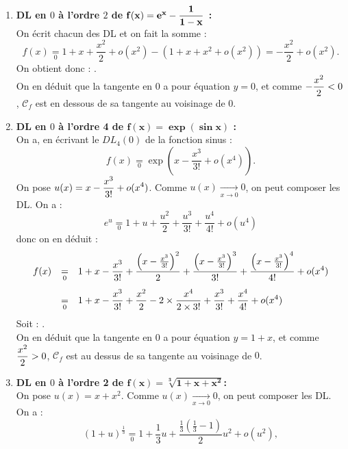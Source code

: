 \documentclass[a4paper, 11pt,reqno]{article}
\begin{document}
\begin{correction}  \;
	\begin{enumerate}
		\item \textbf{DL en $0$ \`a l'ordre $2$ de $\mathbf{f(x)=e^x-\displaystyle\frac{1}{1-x}}$ :}\\
		      On \'ecrit chacun des DL et on fait la somme :
		      $$f(x) \underset{0}{=}  1+x+\frac{x^2}{2}+o(x^2) - (1+x+x^2+o(x^2)) = -\frac{x^2}{2} + o(x^2).$$
		      On obtient donc : .\\
		      On en d\'eduit que la tangente en $0$ a pour \'equation $y=0$, et comme $-\displaystyle\frac{x^2}{2}<0$, $\mathcal{C}_f$ est en dessous de sa tangente au voisinage de $0$.
		\item \textbf{DL en $0$ \`a l'ordre 4 de $\mathbf{f(x)=\exp{(\sin{x})}}$ :}\\
		      On a, en \'ecrivant le $DL_4(0)$ de la fonction sinus :
		      $$f(x) \underset{0}{=}  \exp\left( x-\frac{x^3}{3!} + o(x^4)\right).$$
		      On pose $u(x) = \displaystyle x-\frac{x^3}{3!} + o(x^4)$. Comme $u(x) \mathop{\rightarrow}\limits_{x\to 0} 0$, on peut composer les DL. On a :
		      $$e^u \underset{0}{=} 1+u+\frac{u^2}{2} + \frac{u^3}{3!} + \frac{u^4}{4!} + o(u^4)$$
		      donc on en d\'eduit :
		      $$\begin{array}{rcl}
				      f(x) & \underset{0}{=} & \ddp 1 + x-\frac{x^3}{3!} + \frac{\left(x-\frac{x^3}{3!}\right)^2}{2} + \frac{\left(x-\frac{x^3}{3!}\right)^3}{3!} + \frac{\left(x-\frac{x^3}{3!}\right)^4}{4!} + o(x^4)\vsec \\
				           & \underset{0}{=} & \ddp 1 + x-\frac{x^3}{3!} + \frac{x^2}{2} - 2 \times \frac{x^4}{2\times 3!} + \frac{x^3}{3!} + \frac{x^4}{4!} + o(x^4)
			      \end{array}
		      $$
		      Soit : .\\
		      On en d\'eduit que la tangente en $0$ a pour \'equation $y=1+x$, et comme $\displaystyle\frac{x^2}{2}>0$, $\mathcal{C}_f$ est au dessus de sa tangente au voisinage de $0$.
		\item \textbf{DL en $0$  \`a l'ordre 2 de $\mathbf{f(x)=\sqrt[3]{1+x+x^2}}$:}\\
		      On pose $u(x) = x+x^2$. Comme $u(x) \mathop{\rightarrow}\limits_{x\to 0} 0$, on peut composer les DL. On a :
		      $$(1+u)^{\frac{1}{3}} \underset{0}{=} 1+\frac{1}{3} u + \frac{\frac{1}{3}\left(\frac{1}{3}-1\right)}{2} u^2 + o(u^2),$$

\end{enumerate}
\end{correction}
\end{document}
